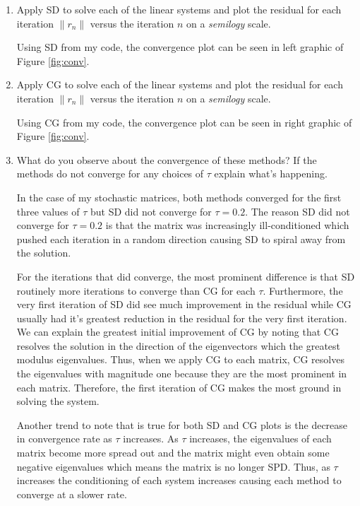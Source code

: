 \documentclass[a4paper,12pt]{article}
\newcommand{\norm}[1]{\lVert #1 \rVert}
\begin{document}
\begin{enumerate}[label = \arabic*)]
\begin{enumerate}[label = (\alph*)]
		\item Apply SD to solve each of the linear systems and plot the residual for each iteration $ \norm{r_n} $ versus the iteration $ n $ on a \emph{semilogy} scale. 
		
		Using SD from my code, the convergence plot can be seen in left graphic of Figure \ref{fig:conv}.
		
		\item Apply CG to solve each of the linear systems and plot the residual for each iteration $ \norm{r_n} $ versus the iteration $ n $ on a \emph{semilogy} scale.
		
		Using CG from my code, the convergence plot can be seen in right graphic of Figure \ref{fig:conv}.
		
		\item What do you observe about the convergence of these methods? If the methods do not converge for any choices of $ \tau $ explain what's happening.
		
		In the case of my stochastic matrices, both methods converged for the first three values of $ \tau $ but SD did not converge for $ \tau = 0.2 $. The reason SD did not converge for $ \tau = 0.2 $ is that the matrix was increasingly ill-conditioned which pushed each iteration in a random direction causing SD to spiral away from the solution.
		
		For the iterations that did converge, the most prominent difference is that SD routinely more iterations to converge than CG for each $ \tau $. Furthermore, the very first iteration of SD did see much improvement in the residual while CG usually had it's greatest reduction in the residual for the very first iteration. We can explain the greatest initial improvement of CG by noting that CG resolves the solution in the direction of the eigenvectors which the greatest modulus eigenvalues. Thus, when we apply CG to each matrix, CG resolves the eigenvalues with magnitude one because they are the most prominent in each matrix. Therefore, the first iteration of CG makes the most ground in solving the system.
		
		Another trend to note that is true for both SD and CG plots is the decrease in convergence rate as $ \tau $ increases. As $ \tau $ increases, the eigenvalues of each matrix become more spread out and the matrix might even obtain some negative eigenvalues which means the matrix is no longer SPD. Thus, as $ \tau $ increases the conditioning of each system increases causing each method to converge at a slower rate.
		

\end{enumerate}
\end{enumerate}
\end{document}
